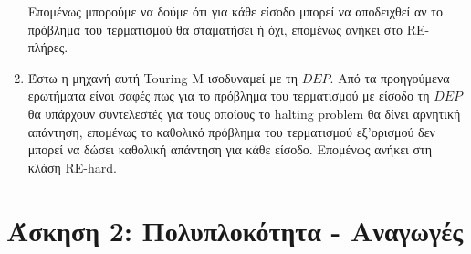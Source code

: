 \documentclass{article}
\begin{document}
\begin{enumerate}
Επομένως μπορούμε να δούμε ότι για κάθε είσοδο μπορεί να αποδειχθεί αν το πρόβλημα του τερματισμού 
θα σταματήσει ή όχι, επομένως ανήκει στο RE-πλήρες.\\

    \item{}
Έστω η μηχανή αυτή Touring M ισοδυναμεί με τη $DEP$. Από τα προηγούμενα ερωτήματα είναι σαφές πως για
το πρόβλημα του τερματισμού με είσοδο τη $DEP$ θα υπάρχουν συντελεστές για τους οποίους το halting problem 
θα δίνει αρνητική απάντηση, επομένως το καθολικό πρόβλημα του τερματισμού εξ'ορισμού δεν μπορεί να δώσει
καθολική απάντηση για κάθε είσοδο. Επομένως ανήκει στη κλάση RE-hard.\\
\end{enumerate}
\pagebreak

\section{Άσκηση 2: Πολυπλοκότητα - Αναγωγές}
\end{document}
